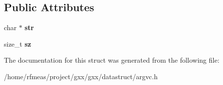 \subsection*{Public Attributes}
\begin{DoxyCompactItemize}
\item 
char $\ast$ {\bfseries str}\hypertarget{structstr__argvc__t_a29cff8e848371957525bba376b3afb71}{}\label{structstr__argvc__t_a29cff8e848371957525bba376b3afb71}

\item 
size\+\_\+t {\bfseries sz}\hypertarget{structstr__argvc__t_afcdcf87d4532d462fe3df4a5e0d0aa83}{}\label{structstr__argvc__t_afcdcf87d4532d462fe3df4a5e0d0aa83}

\end{DoxyCompactItemize}


The documentation for this struct was generated from the following file\+:\begin{DoxyCompactItemize}
\item 
/home/rfmeas/project/gxx/gxx/datastruct/argvc.\+h\end{DoxyCompactItemize}
